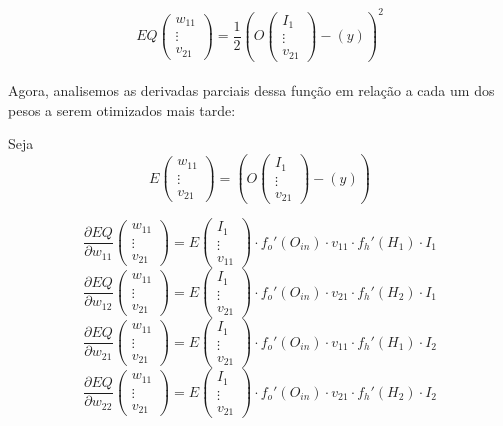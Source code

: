 \documentclass{article}
\begin{document}
$$
    EQ\begin{pmatrix}w_{11}\\\vdots\\v_{21}\end{pmatrix} = \frac{1}{2}(O\begin{pmatrix}I_{1}\\ \vdots \\v_{21} \end{pmatrix} - (y))^2
$$
\\

Agora, analisemos as derivadas parciais dessa função em relação a cada um dos pesos a serem otimizados mais tarde:

Seja
$$ E\begin{pmatrix}w_{11}\\\vdots\\v_{21}\end{pmatrix} = (O\begin{pmatrix}I_{1}\\ \vdots \\v_{21} \end{pmatrix} - (y))
$$

$$
    \frac{\partial EQ}{\partial w_{11}}\begin{pmatrix}w_{11}\\\vdots\\v_{21}\end{pmatrix} = E\begin{pmatrix}I_{1}\\ \vdots \\v_{11} \end{pmatrix}\cdot f_o'(O_{in})\cdot v_{11} \cdot f_h'(H_{1})\cdot I_{1}
$$
$$
    \frac{\partial EQ}{\partial w_{12}}\begin{pmatrix}w_{11}\\\vdots\\v_{21}\end{pmatrix} = E\begin{pmatrix}I_{1}\\ \vdots \\v_{21} \end{pmatrix}\cdot f_o'(O_{in})\cdot v_{21} \cdot f_h'(H_{2})\cdot I_{1}
$$
$$
    \frac{\partial EQ}{\partial w_{21}}\begin{pmatrix}w_{11}\\\vdots\\v_{21}\end{pmatrix} = E\begin{pmatrix}I_{1}\\ \vdots \\v_{21} \end{pmatrix}\cdot f_o'(O_{in})\cdot v_{11} \cdot f_h'(H_{1})\cdot I_{2}
$$
$$
    \frac{\partial EQ}{\partial w_{22}}\begin{pmatrix}w_{11}\\\vdots\\v_{21}\end{pmatrix} = E\begin{pmatrix}I_{1}\\ \vdots \\v_{21} \end{pmatrix}\cdot f_o'(O_{in})\cdot v_{21} \cdot f_h'(H_{2})\cdot I_{2}
$$
\end{document}
